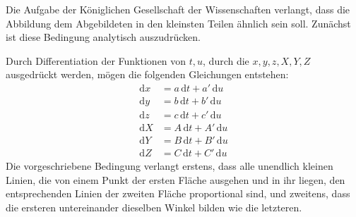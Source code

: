 Die Aufgabe der Königlichen Gesellschaft der Wissenschaften verlangt, dass die Abbildung dem Abgebildeten in den kleinsten Teilen ähnlich sein soll. Zunächst ist diese Bedingung analytisch auszudrücken.

Durch Differentiation der Funktionen von \(t,u\), durch die \(x,\allowbreak y,\allowbreak z,\allowbreak X,\allowbreak Y,\allowbreak Z\) ausgedrückt werden, mögen die folgenden Gleichungen entstehen:
\[
\begin{aligned}
\mathrm{d}x&=a\,\mathrm{d}t+a'\,\mathrm{d}u\\
\mathrm{d}y&=b\,\mathrm{d}t+b'\,\mathrm{d}u\\
\mathrm{d}z&=c\,\mathrm{d}t+c'\,\mathrm{d}u\\
\mathrm{d}X&=A\,\mathrm{d}t+A'\,\mathrm{d}u\\
\mathrm{d}Y&=B\,\mathrm{d}t+B'\,\mathrm{d}u\\
\mathrm{d}Z&=C\,\mathrm{d}t+C'\,\mathrm{d}u
\end{aligned}
\]
\noindent Die vorgeschriebene Bedingung verlangt erstens, dass alle unendlich kleinen Linien, die von einem Punkt der ersten Fläche ausgehen und in ihr liegen, den entsprechenden Linien der zweiten Fläche proportional sind, und zweitens, dass die ersteren untereinander dieselben Winkel bilden wie die letzteren.

